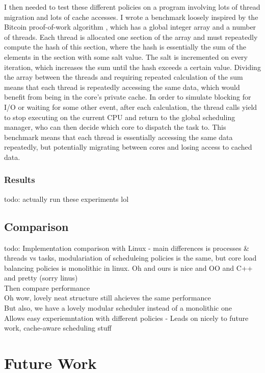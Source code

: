 \documentclass[bsc,frontabs,singlespacing,parskip,deptreport]{infthesis}     %
\begin{document}
I then needed to test these different policies on a program involving lots of thread migration and lots of cache accesses. I wrote a benchmark loosely inspired by the Bitcoin proof-of-work algorithm \cite{proof-of-work}, which has a global integer array and a number of threads. Each thread is allocated one section of the array and must repeatedly compute the hash of this section, where the hash is essentially the sum of the elements in the section with some salt value. The salt is incremented on every iteration, which increases the sum until the hash exceeds a certain value. Dividing the array between the threads and requiring repeated calculation of the sum means that each thread is repeatedly accessing the same data, which would benefit from being in the core's private cache. In order to simulate blocking for I/O or waiting for some other event, after each calculation, the thread calls yield to stop executing on the current CPU and return to the global scheduling manager, who can then decide which core to dispatch the task to. This benchmark means that each thread is essentially accessing the same data repeatedly, but potentially migrating between cores and losing access to cached data. \\

\subsection{Results}
todo: actually run these experiments lol




\section{Comparison}
todo: Implementation comparison with Linux - main differences is processes & threads vs tasks, modulariation of scheduleing policies is the same, but core load balancing policies is monolithic in linux. Oh and ours is nice and OO and C++ and pretty (sorry linus) \\
Then compare performance \\
Oh wow, lovely neat structure still ahcieves the same performance \\
But also, we have a lovely modular scheduler instead of a monolithic one \\
Allows easy experiemntation with different policies -
Leads on nicely to future work, cache-aware scheduling stuff

\chapter{Future Work} \label{future-work}
\end{document}
